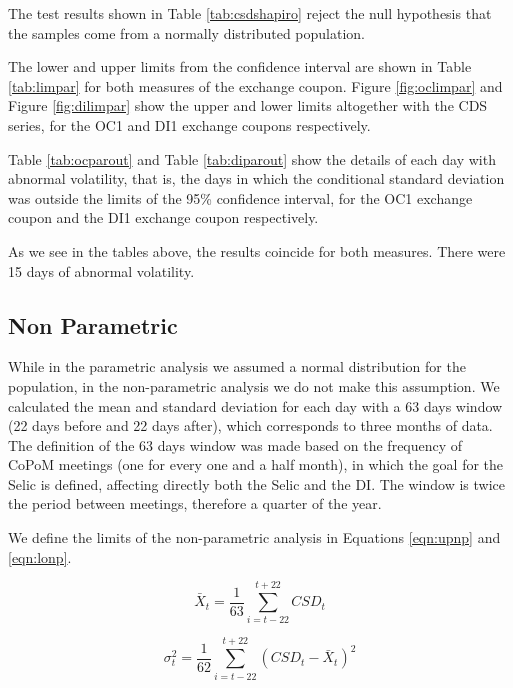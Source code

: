 \documentclass[cic,tc, english]{iiufrgs}
\begin{document}
    The test results shown in Table \ref{tab:csdshapiro} reject the null hypothesis that the samples come from a normally distributed population.

    The lower and upper limits from the confidence interval are shown in Table \ref{tab:limpar} for both measures of the exchange coupon. Figure \ref{fig:oclimpar} and Figure \ref{fig:dilimpar} show the upper and lower limits altogether with the CDS series, for the OC1 and DI1 exchange coupons respectively.

    

    

    

    Table \ref{tab:ocparout} and Table \ref{tab:diparout} show the details of each day with abnormal volatility, that is, the days in which the conditional standard deviation was outside the limits of the 95\% confidence interval, for the OC1 exchange coupon and the DI1 exchange coupon respectively.

    

    

    As we see in the tables above, the results coincide for both measures. There were 15 days of abnormal volatility.

\subsection{Non Parametric}

    While in the parametric analysis we assumed a normal distribution for the population, in the non-parametric analysis we do not make this assumption. We calculated the mean and standard deviation for each day with a 63 days window (22 days before and 22 days after), which corresponds to three months of data. The definition of the 63 days window was made based on the frequency of CoPoM meetings (one for every one and a half month), in which the goal for the Selic is defined, affecting directly both the Selic and the DI. The window is twice the period between meetings, therefore a quarter of the year.

    We define the limits of the non-parametric analysis in Equations \ref{eqn:upnp} and \ref{eqn:lonp}.

    $$\bar{X}_t = \frac{1}{63} \displaystyle\sum_{i=t-22}^{t+22} CSD_t$$

    $$\sigma^2_t = \frac{1}{62} \displaystyle\sum_{i=t-22}^{t+22} (CSD_t - \bar{X}_t)^2$$
\end{document}
